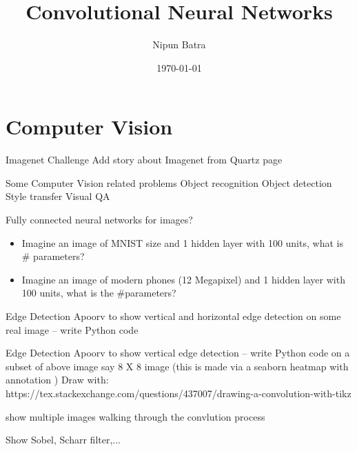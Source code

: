\documentclass{beamer}
\title{Convolutional Neural Networks}
\date{\today}
\author{Nipun Batra}
\institute{IIT Gandhinagar}
\begin{document}
  \maketitle
  
  
  
\section{Computer Vision}

\begin{frame}{Imagenet Challenge}
Add story about Imagenet from Quartz page
\end{frame}

\begin{frame}{Some Computer Vision related problems}
Object recognition
Object detection
Style transfer
Visual QA
\end{frame}

\begin{frame}{Fully connected neural networks for images?}
\begin{itemize}
	\item Imagine an image of MNIST size and 1 hidden layer with 100 units, what is \# parameters?
	\item Imagine an image of modern phones (12 Megapixel) and 1 hidden layer with 100 units, what is the \#parameters?
\end{itemize}
\end{frame}

\begin{frame}{Edge Detection}
Apoorv to show vertical and horizontal edge detection on some real image -- write Python code

\end{frame}
\begin{frame}{Edge Detection}
Apoorv to show vertical edge detection -- write Python code on a subset of above image say 8 X 8 image (this is made via a seaborn heatmap with annotation ) 
Draw with: https://tex.stackexchange.com/questions/437007/drawing-a-convolution-with-tikz

show multiple images walking through the convlution process
\end{frame}

\begin{frame}
Show Sobel, Scharr filter,...
\end{frame}
\end{document}
